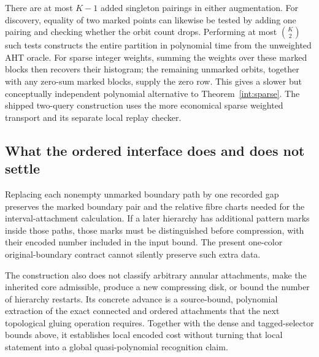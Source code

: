 There are at most $K-1$ added singleton pairings in either augmentation.
For discovery, equality of two marked points can likewise be tested by
adding one pairing and checking whether the orbit count drops.  Performing
at most $\binom K2$ such tests constructs the entire partition in polynomial
time from the unweighted AHT oracle.  For sparse integer weights, summing
the weights over these marked blocks then recovers their histogram; the
remaining unmarked orbits, together with any zero-sum marked blocks, supply
the zero row.  This gives a slower but conceptually independent polynomial
alternative to Theorem~\ref{int:sparse}.  The shipped two-query construction
uses the more economical sparse weighted transport and its separate local
replay checker.

\subsection{What the ordered interface does and does not settle}
\label{int:limits}

Replacing each nonempty unmarked boundary path by one recorded gap preserves
the marked boundary pair and the relative fibre charts needed for the
interval-attachment calculation.  If a later hierarchy has additional
pattern marks inside those paths, those marks must be distinguished before
compression, with their encoded number included in the input bound.  The
present one-color original-boundary contract cannot silently preserve such
extra data.

The construction also does not classify arbitrary annular attachments,
make the inherited core admissible, produce a new compressing disk, or bound
the number of hierarchy restarts.  Its concrete advance is a source-bound,
polynomial extraction of the exact connected and ordered attachments that
the next topological gluing operation requires.  Together with the dense
and tagged-selector bounds above, it establishes local encoded cost without
turning that local statement into a global quasi-polynomial recognition
claim.
